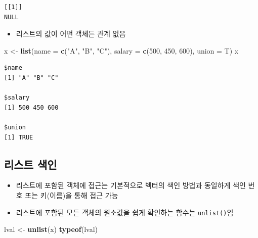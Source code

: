 \documentclass[
  11pt,
]{krantz}
\newenvironment{Shaded}{\begin{snugshade}}{\end{snugshade}}
\newcommand{\DataTypeTok}[1]{\textcolor[rgb]{0.27,0.27,0.27}{#1}}
\newcommand{\DecValTok}[1]{\textcolor[rgb]{0.06,0.06,0.06}{#1}}
\newcommand{\KeywordTok}[1]{\textcolor[rgb]{0.27,0.27,0.27}{\textbf{#1}}}
\newcommand{\NormalTok}[1]{#1}
\newcommand{\StringTok}[1]{\textcolor[rgb]{0.5,0.5,0.5}{#1}}
\providecommand{\tightlist}{%
  \setlength{\itemsep}{0pt}\setlength{\parskip}{0pt}}
\begin{document}
\begin{verbatim}
[[1]]
NULL
\end{verbatim}

\normalsize

\begin{itemize}
\tightlist
\item
  리스트의 값이 어떤 객체든 관계 없음
\end{itemize}

\footnotesize

\begin{Shaded}
\begin{Highlighting}[]
\NormalTok{x <-}\StringTok{ }\KeywordTok{list}\NormalTok{(}\DataTypeTok{name =} \KeywordTok{c}\NormalTok{(}\StringTok{"A"}\NormalTok{, }\StringTok{"B"}\NormalTok{, }\StringTok{"C"}\NormalTok{), }
          \DataTypeTok{salary =} \KeywordTok{c}\NormalTok{(}\DecValTok{500}\NormalTok{, }\DecValTok{450}\NormalTok{, }\DecValTok{600}\NormalTok{), }\DataTypeTok{union =}\NormalTok{ T)}
\NormalTok{x}
\end{Highlighting}
\end{Shaded}

\begin{verbatim}
$name
[1] "A" "B" "C"

$salary
[1] 500 450 600

$union
[1] TRUE
\end{verbatim}

\normalsize

\hypertarget{list-index}{%
\subsection{리스트 색인}\label{list-index}}

\begin{itemize}
\tightlist
\item
  리스트에 포함된 객체에 접근는 기본적으로 벡터의 색인 방법과 동일하게 색인 번호 또는 키(이름)을 통해 접근 가능
\item
  리스트에 포함된 모든 객체의 원소값을 쉽게 확인하는 함수는 \texttt{unlist()}임
\end{itemize}

\footnotesize

\begin{Shaded}
\begin{Highlighting}[]
\NormalTok{lval <-}\StringTok{ }\KeywordTok{unlist}\NormalTok{(x)}
\KeywordTok{typeof}\NormalTok{(lval)}
\end{Highlighting}
\end{Shaded}
\end{document}
